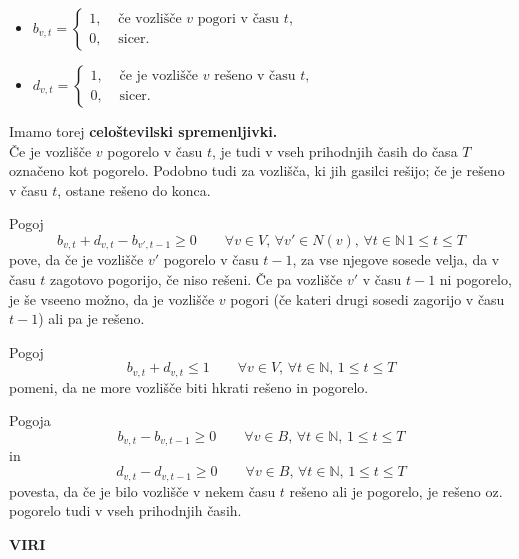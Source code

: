 \documentclass[a4paper, 11pt]{article}
\begin{document}
\begin{itemize} 
    \item $b_{v,t} = \begin{cases}
    1, & \text{ če  vozlišče $v$ pogori v času $t$} ,\\
    0, & \text{ sicer.}
    \end{cases} $

    \item $d_{v,t} = \begin{cases}
        1, & \text{ če je vozlišče $v$ rešeno v času $t$} ,\\
        0, & \text{ sicer.}
        \end{cases} $
\end{itemize}
Imamo torej \textbf{celoštevilski spremenljivki.} \\
Če je vozlišče $v$ pogorelo v času $t$, je tudi v vseh prihodnjih časih do časa $T$ označeno kot pogorelo. 
Podobno tudi za vozlišča, ki jih gasilci rešijo; če je rešeno v času $t$, ostane rešeno do konca.

Pogoj $$b_{v,t} + d_{v,t} - b_{v',t-1} \ge 0 \qquad \forall v \in V ,\, \forall v' \in N(v) ,\, \forall t \in \mathbb{N} \, 1 \le t \le T $$
pove, da če je vozlišče $v'$ pogorelo v času $t-1$, za vse njegove sosede velja, da v času $t$  zagotovo pogorijo, če 
niso rešeni. Če pa vozlišče $v'$ v času $t-1$ ni pogorelo, je še vseeno možno, da je vozlišče $v$ pogori (če kateri drugi sosedi zagorijo v času $t-1$) ali pa je rešeno.

Pogoj $$b_{v,t} + d_{v,t} \le 1 \qquad \forall v \in V ,\, \forall t \in \mathbb{N} ,\, 1 \le t \le T$$
pomeni, da ne more vozlišče biti hkrati rešeno in pogorelo.

Pogoja $$b_{v,t} - b_{v,t-1} \ge 0 \qquad \forall v \in B ,\, \forall t \in \mathbb{N} ,\, 1 \le t \le T$$ in 
$$d_{v,t} - d_{v,t-1} \ge 0 \qquad \forall v \in B ,\, \forall t \in \mathbb{N} ,\, 1 \le t \le T$$
povesta, da če je bilo vozlišče v nekem času $t$ rešeno ali je pogorelo, je rešeno oz. pogorelo tudi v vseh prihodnjih časih.








    













\noindent \textbf{VIRI} \\




\printindex
\end{document}
